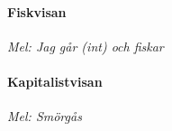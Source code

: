 \documentclass[12pt]{article}
\begin{document}
\noindent
\begin{minipage}{.45\textwidth}
	\paragraph*{Fiskvisan\\}
	\vspace{3px}
	\textit{Mel: Jag går (int) och fiskar}\\
\end{minipage}%
\hspace{0.1\textwidth}
\noindent
\begin{minipage}{.45\textwidth}
	\paragraph*{Kapitalistvisan\\}
	\vspace{3px}
	\textit{Mel: Smörgås}\\
\end{minipage}
\end{document}
